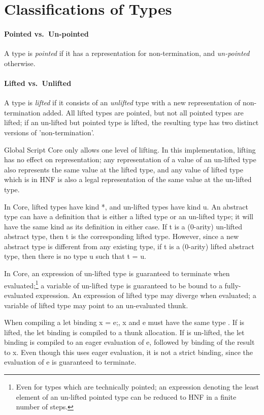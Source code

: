 \documentclass{report}
\newcommand\defn[1]{\emph{#1}}
\newcommand\lift[1]{\left\lfloor#1\right\rfloor}
\begin{document}
\section{Classifications of Types}

\paragraph{Pointed vs.~Un-pointed}
A type is \defn{pointed} if it has a representation for non-termination, and \defn{un-pointed} otherwise.

\paragraph{Lifted vs.~Unlifted}
A type is \defn{lifted} if it consists of an \defn{unlifted} type with a new representation of non-termination added.
All lifted types are pointed, but not all pointed types are lifted;
if an un-lifted but pointed type is lifted,
the resulting type has two distinct versions of 'non-termination'.

Global Script Core only allows one level of lifting.
In this implementation, lifting has no effect on representation;
any representation of a value of an un-lifted type also represents the same value at the lifted type,
and any value of lifted type which is in HNF is also a legal representation of the same value at the un-lifted type.

In Core, lifted types have kind \<*\>, and un-lifted types have kind \<u\>.
An abstract type can have a definition that is either a lifted type or an un-lifted type;
it will have the same kind as its definition in either case.
If \<t\> is a (0-arity) un-lifted abstract type, then \<\lift{t}\> is the corresponding lifted type.
However, since a new abstract type is different from any existing type,
if \<t\> is a (0-arity) lifted abstract type, then there is no type \<u\> such that \<t = \lift{u}\>.

In Core, an expression of un-lifted type is guaranteed to terminate when evaluated;\footnote{
    Even for types which are technically pointed;
    an expression denoting the least element of an un-lifted pointed type
    can be reduced to HNF in a finite number of steps.
} a variable of un-lifted type is guaranteed to be bound to a fully-evaluated expression.
An expression of lifted type may diverge when evaluated;
a variable of lifted type may point to an un-evaluated thunk.

When compiling a let binding \<x = e;\>, \<x\> and \<e\> must have the same type \<\tau\>.
If \<\tau\> is lifted, the let binding is compiled to a thunk allocation.
If \<\tau\> is un-lifted, the let binding is compiled to an eager evaluation of \<e\>,
followed by binding of the result to \<x\>.
Even though this uses eager evaluation, it is not a strict binding, since the evaluation of \<e\> is guaranteed to terminate.
\end{document}

